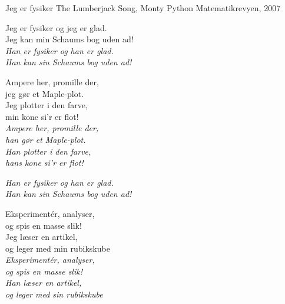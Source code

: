 \begin{song}{Jeg er fysiker}
  {} %
  {The Lumberjack Song, Monty Python} %
  {} %
  {Matematikrevyen, 2007} %
  {\NotCCLIed} %

  \begin{SBChorus}
    Jeg er fysiker og jeg er glad.\\
    Jeg kan min Schaums bog uden ad!\\\medskip
    \emph{Han er fysiker og han er glad.\\
    Han kan sin Schaums bog uden ad!}
  \end{SBChorus}

  \begin{SBVerse}
    Ampere her, promille der,\\
    jeg gør et Maple-plot.\\
    Jeg plotter i den farve,\\
    min kone si’r er flot!\\\medskip
    \emph{Ampere her, promille der,\\
    han gør et Maple-plot.\\
    Han plotter i den farve,\\
    hans kone si’r er flot!}
  \end{SBVerse}

  \begin{SBChorus}
    \emph{Han er fysiker og han er glad.\\
    Han kan sin Schaums bog uden ad!}
  \end{SBChorus}

  \begin{SBVerse}
    Eksperimentér, analyser,\\
    og spis en masse slik!\\
    Jeg læser en artikel,\\
    og leger med min rubikskube\\\medskip
    \emph{Eksperimentér, analyser,\\
    og spis en masse slik!\\
    Han læser en artikel,\\
    og leger med sin rubikskube}
  \end{SBVerse}


\end{song}
